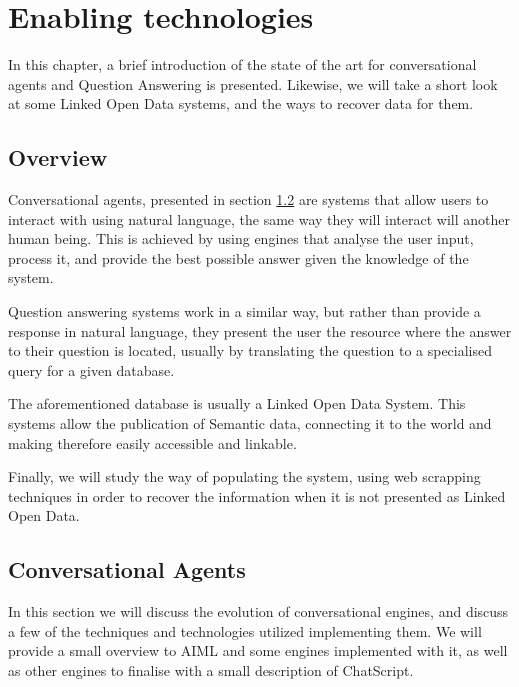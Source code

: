 \chapter{Enabling technologies}
\label{chap:state_of_the_art}

\begin{chapterintro}

In this chapter, a brief introduction of the state of the art for conversational agents and Question Answering is presented. Likewise, we will take a short look at some Linked Open Data systems, and the ways to recover data for them.

\end{chapterintro}

\cleardoublepage

\section{Overview}

Conversational agents, presented in section \ref{sec:conv_agents} are systems that allow users to interact with using natural language, the same way they will interact will another human being. This is achieved by using engines that analyse the user input, process it, and provide the best possible answer given the knowledge of the system.

Question answering systems work in a similar way, but rather than provide a response in natural language, they present the user the resource where the answer to their question is located, usually by translating the question to a specialised query for a given database.

The aforementioned database is usually a Linked Open Data System. This systems allow the publication of Semantic data, connecting it to the world and making therefore easily accessible and linkable.

Finally, we will study the way of populating the system, using web scrapping techniques in order to recover the information when it is not presented as Linked Open Data.

\section{Conversational Agents}
\label{sec:conv_agents}

In this section we will discuss the evolution of conversational engines, and discuss a few of the techniques and technologies utilized implementing them. We will provide a small overview to \ac{AIML} and some engines implemented with it, as well as other engines to finalise with a small description of ChatScript.

